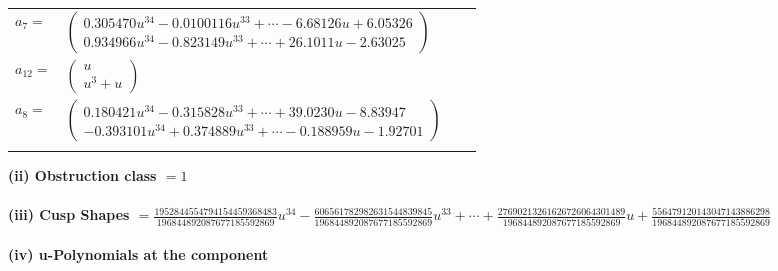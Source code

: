 \documentclass[1p]{elsarticle_modified}
\theoremstyle{definition}
\begin{document}
\begin{tabular}{m{7pt} m{180pt} m{7pt} m{180pt} }
\flushright $a_{7}=$&$\begin{pmatrix}0.305470 u^{34}-0.0100116 u^{33}+\cdots-6.68126 u+6.05326\\0.934966 u^{34}-0.823149 u^{33}+\cdots+26.1011 u-2.63025\end{pmatrix}$ \\
\flushright $a_{12}=$&$\begin{pmatrix}u\\u^3+u\end{pmatrix}$ \\
\flushright $a_{8}=$&$\begin{pmatrix}0.180421 u^{34}-0.315828 u^{33}+\cdots+39.0230 u-8.83947\\-0.393101 u^{34}+0.374889 u^{33}+\cdots-0.188959 u-1.92701\end{pmatrix}$\\&\end{tabular}
\flushleft \textbf{(ii) Obstruction class $= 1$}\\~\\
\flushleft \textbf{(iii) Cusp Shapes $= \frac{1952844554794154459368483}{196844892087677185592869} u^{34}-\frac{606561782982631544839845}{196844892087677185592869} u^{33}+\cdots+\frac{27690213261626726064301489}{196844892087677185592869} u+\frac{556479120143047143886298}{196844892087677185592869}$}\\~\\
\newpage\renewcommand{\arraystretch}{1}
\flushleft \textbf{(iv) u-Polynomials at the component}\newline \\
\end{document}
